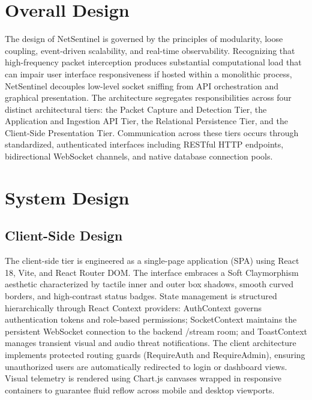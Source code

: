 \documentclass[a4paper,12pt]{report}
\begin{document}
	\section{Overall Design}
	\par
	The design of NetSentinel is governed by the principles of modularity, loose coupling, event-driven scalability, and real-time observability. Recognizing that high-frequency packet interception produces substantial computational load that can impair user interface responsiveness if hosted within a monolithic process, NetSentinel decouples low-level socket sniffing from API orchestration and graphical presentation. The architecture segregates responsibilities across four distinct architectural tiers: the Packet Capture and Detection Tier, the Application and Ingestion API Tier, the Relational Persistence Tier, and the Client-Side Presentation Tier. Communication across these tiers occurs through standardized, authenticated interfaces including RESTful HTTP endpoints, bidirectional WebSocket channels, and native database connection pools.
	
	\section{System Design}
	\subsection{Client-Side Design}
	\par
	The client-side tier is engineered as a single-page application (SPA) using React 18, Vite, and React Router DOM. The interface embraces a Soft Claymorphism aesthetic characterized by tactile inner and outer box shadows, smooth curved borders, and high-contrast status badges. State management is structured hierarchically through React Context providers: AuthContext governs authentication tokens and role-based permissions; SocketContext maintains the persistent WebSocket connection to the backend /stream room; and ToastContext manages transient visual and audio threat notifications. The client architecture implements protected routing guards (RequireAuth and RequireAdmin), ensuring unauthorized users are automatically redirected to login or dashboard views. Visual telemetry is rendered using Chart.js canvases wrapped in responsive containers to guarantee fluid reflow across mobile and desktop viewports.
	
\end{document}
